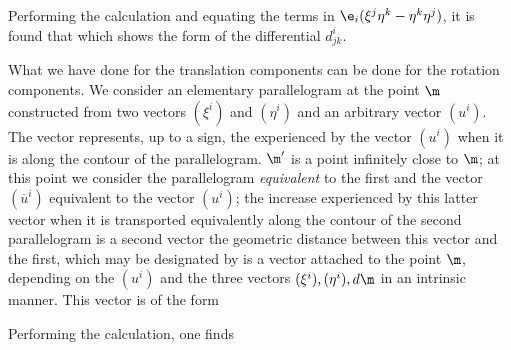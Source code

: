 Performing the calculation and equating the terms in $\e_i(\xi^j \eta^k - \eta^k \eta^j)$, it is found that
which shows the form of the differential $d_{jk}^i$.

What we have done for the translation components can be done for the rotation components. We consider an elementary parallelogram at the point $\m$ constructed from two vectors $(\xi^i)$ and $(\eta^i)$ and an arbitrary vector $(u^i)$. The vector
represents, up to a sign, the  experienced by the vector $(u^i)$ when it is  along the contour of the parallelogram. $\m'$ is a point infinitely close to $\m$; at this point we consider the parallelogram \textit{equivalent} to the first and the vector $(\overline{u}^i)$ equivalent to the vector $(u^i)$; the increase experienced by this latter vector when it is transported equivalently along the contour of the second parallelogram is a second vector
the geometric distance between this vector and the first, which may be designated by
is a vector attached to the point $\m$, depending on the $(u^i)$ and the three vectors $(\xi^i), (\eta^i), d\m$ in an intrinsic manner. This vector is of the form

Performing the calculation, one finds

